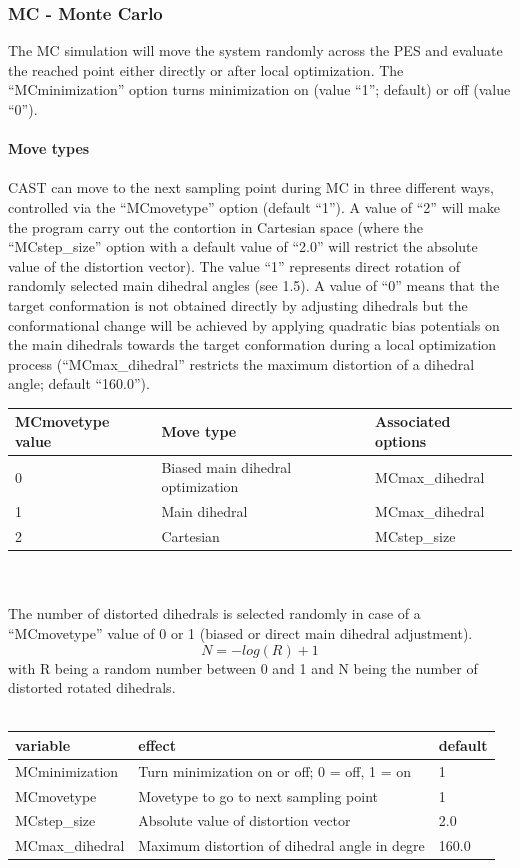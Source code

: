 \documentclass[10pt,a4paper]{article} %
\begin{document}
	\subsubsection{MC - Monte Carlo}
	The \ac{MC} simulation will move the system randomly across the \ac{PES} and evaluate the reached point either directly or after local optimization. The ``MCminimization'' option turns minimization on (value ``1''; default) or off (value ``0''). \\~\\
	\textbf{Move types}\\~\\
	\ac{CAST} can move to the next sampling point during \ac{MC} in three different ways, controlled via the ``MCmovetype'' option (default ``1''). A value of ``2'' will make the program carry out the contortion in Cartesian space (where the ``MCstep\_size'' option with a default value of ``2.0'' will restrict the absolute value of the distortion vector). The value ``1'' represents direct rotation of randomly selected main dihedral angles (see 1.5). A value of ``0'' means that the target conformation is not obtained directly by adjusting dihedrals but the conformational change will be achieved by applying quadratic bias potentials on the main dihedrals towards the target conformation during a local optimization process (``MCmax\_dihedral'' restricts the maximum distortion of a dihedral angle; default ``160.0''). \\
		
	\begin{tabularx}{\textwidth}{l|X|X}
		MCmovetype value & Move type & Associated options \\
		\hline
		0 & Biased main dihedral optimization & MCmax\_dihedral \\
		1 & Main dihedral & MCmax\_dihedral \\
		2 & Cartesian & MCstep\_size \\
	\end{tabularx}
	\\~\\
	The number of distorted dihedrals is selected randomly in case of a ``MCmovetype'' value of 0 or 1 (biased or direct main dihedral adjustment).
	\begin{equation}
	N = - log (R) + 1
	\end{equation}
	with R being a random number between 0 and 1 and N being the number of distorted rotated dihedrals.\\~\\
	\begin{tabularx}{\textwidth}{l|X|X}
		variable & effect & default \\
		\hline
		MCminimization & Turn minimization on or off; 0 = off, 1 = on & 1 \\
		MCmovetype & Movetype to go to next sampling point & 1 \\
		MCstep\_size & Absolute value of distortion vector & 2.0 \\
		MCmax\_dihedral & Maximum distortion of dihedral angle in degre & 160.0 \\
	\end{tabularx}
	\\~\\
		
\end{document}
